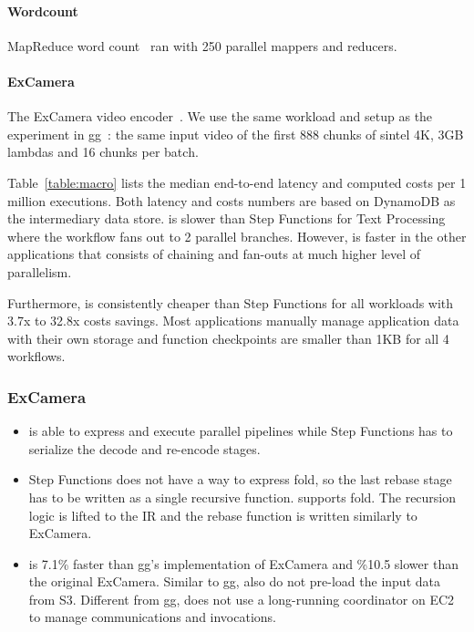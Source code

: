 \paragraph{Wordcount} MapReduce word count~\cite{mapreduce} ran with 250
parallel mappers and reducers.

\paragraph{ExCamera} The ExCamera video encoder~\cite{excamera, gg-atc}. We
use the same workload and setup as the experiment in gg~\cite{gg-atc}: the same
input video of the first 888 chunks of sintel 4K, 3GB lambdas and 16 chunks
per batch.

Table~\ref{table:macro} lists the median end-to-end latency and computed costs
per 1 million executions. Both latency and costs numbers are based on DynamoDB
as the intermediary data store. \name{} is slower than Step Functions for Text
Processing where the workflow fans out to 2 parallel branches.  However,
\name{} is faster in the other applications that consists of chaining and
fan-outs at much higher level of parallelism.

Furthermore, \name{} is consistently cheaper than Step Functions for all
workloads with 3.7x to 32.8x costs savings. Most applications manually manage
application data with their own storage and function checkpoints are smaller
than 1KB for all 4 workflows.

\subsubsection{ExCamera}\label{sec:eval-excamera}

\begin{itemize}

    \item \name{} is able to express and execute parallel pipelines while Step
    Functions has to serialize the decode and re-encode stages.

    \item Step Functions does not have a way to express fold, so the last
    rebase stage has to be written as a single recursive function. \name{}
    supports fold. The recursion logic is lifted to the \name{} IR and the
    rebase function is written similarly to ExCamera.

    \item \name{} is 7.1\% faster than gg's implementation of ExCamera and
    \%10.5 slower than the original ExCamera. Similar to gg, \name{} also do
    not pre-load the input data from S3. Different from gg, \name{} does not
    use a long-running coordinator on EC2 to manage communications and
    invocations.

\end{itemize}

